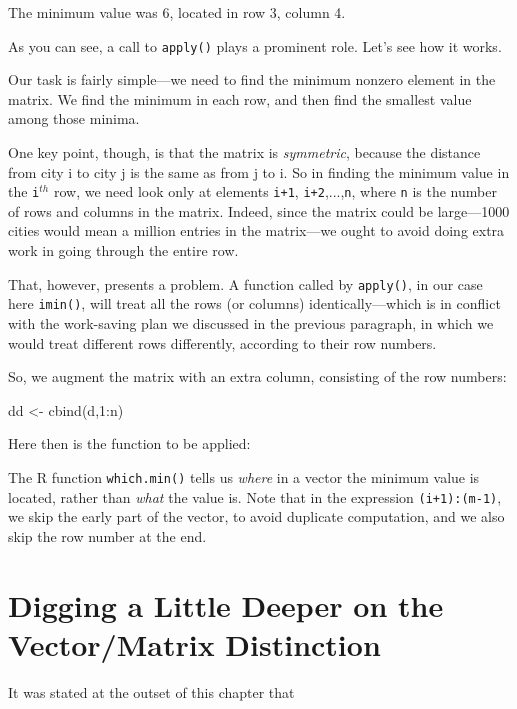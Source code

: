 \noindent
The minimum value was 6, located in row 3, column 4.

As you can see, a call to {\tt apply()} plays a prominent role.  Let's
see how it works.

Our task is fairly simple---we need to find the minimum nonzero element
in the matrix.  We find the minimum in each row, and then find the
smallest value among those minima.

One key point, though, is that the matrix is {\it symmetric}, because
the distance from city i to city j is the same as from j to i.  So in
finding the minimum value in the {\tt i}$^{th}$ row, we need look only
at elements {\tt i+1}, {\tt i+2},...,{\tt n}, where {\tt n} is the
number of rows and columns in the matrix.  Indeed, since the matrix
could be large---1000 cities would mean a million entries in the
matrix---we ought to avoid doing extra work in going through the entire
row.

That, however, presents a problem.  A function called by {\tt apply()},
in our case here {\tt imin()}, will treat all the rows (or columns)
identically---which is in conflict with the work-saving plan we
discussed in the previous paragraph, in which we would treat different
rows differently, according to their row numbers. 

So, we augment the matrix with an extra column, consisting of the row
numbers:

\begin{Code}
dd <- cbind(d,1:n)
\end{Code}

Here then is the function to be applied:

\begin{Code}
imin <- function(x) {
   m <- length(x) 
   i <- x[m]
   j <- which.min(x[(i+1):(m-1)])
   k <- i+j
   return(c(k,x[k]))
\end{Code}

\noindent
The R function {\tt which.min()} tells us {\it where} in a vector the
minimum value is located, rather than {\it what} the value is.  Note
that in the expression {\tt (i+1):(m-1)}, we skip the early part of the
vector, to avoid duplicate computation, and we also skip the row number
at the end.

\section{Digging a Little Deeper on the Vector/Matrix Distinction}

It was stated at the outset of this chapter that

